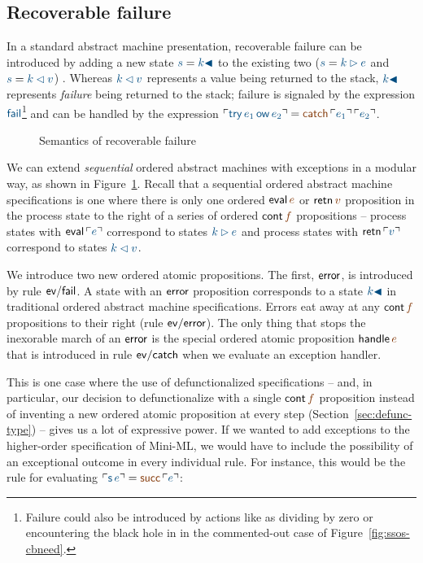 \subsection{Recoverable failure}
\label{sec:failure}

In a standard abstract machine presentation, recoverable failure can 
be introduced by adding a new state $\obj{s} = \obj{k {\blacktriangleleft}}$
to the existing two ($\obj{s} = \obj{k \rhd e}$ and $\obj{s} = \obj{k \lhd v}$)
\cite[Chapter 28]{harper12practical}. Whereas $\obj{k
\lhd v}$ represents a value being returned to the stack, $\obj{k
{\blacktriangleleft}}$ represents {\it failure} being returned to the
stack; failure is signaled by the expression $\obj{\sf fail}$\footnote{Failure 
could also be introduced by actions like as dividing
by zero or encountering the black hole in in the commented-out case of
Figure~\ref{fig:ssos-cbneed}.} and
can be handled by the expression $\interp{{\sf try}\,e_1\,{\sf ow}\,e_2} = 
\lf{{\sf catch}\,\interp{e_1}\,\interp{e_2}}$. 

\begin{figure}
\caption{Semantics of recoverable failure}
\label{fig:ssos-fail}
\end{figure}


We can extend {\it sequential} ordered abstract machines with
exceptions in a modular way, as shown in
Figure~\ref{fig:ssos-fail}. Recall that a sequential ordered abstract
machine specifications is one where there is only one ordered ${\sf
  eval}\,\lf{e}$ 
or ${\sf retn}\,\lf{v}$ proposition in the process state to the
right of a series of ordered ${\sf cont}\,\lf{f}$ propositions -- process
states with ${\sf eval}\,\interp{e}$ correspond to states $\obj{k \rhd e}$
and process states with ${\sf retn}\,\interp{v}$ correspond to states
$\obj{k \lhd v}$. 

We introduce two new ordered atomic propositions. The first, ${\sf
  error}$, is introduced by rule ${\sf ev/fail}$.
 A state with an ${\sf error}$
proposition corresponds to a state $\obj{k{\blacktriangleleft}}$ in
traditional ordered abstract machine specifications. Errors eat away
at any ${\sf cont}\,\lf{f}$ propositions to their right (rule ${\sf
  ev/error}$). The only thing that stops the inexorable march of an
${\sf error}$ is the special ordered atomic proposition ${\sf
  handle}\,\lf{e}$ that is introduced in rule ${\sf ev/catch}$ when we
evaluate an exception handler.

This is one case where the use of defunctionalized specifications --
and, in particular, our decision to defunctionalize with a single
${\sf cont}\,\lf{f}$ proposition instead of inventing a new ordered atomic
proposition at every step (Section~\ref{sec:defunc-type}) -- 
gives us a lot of expressive power. If we
wanted to add exceptions to the higher-order specification of Mini-ML,
we would have to include the possibility of an exceptional outcome in
every individual rule. For instance, this would be the 
rule for evaluating $\interp{{\sf s}\,e} = \lf{{\sf succ}\,\interp{e}}$:

